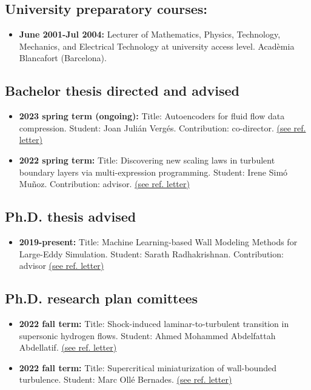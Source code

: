 \documentclass{article}
\begin{document}
\subsection{University preparatory courses:}
\begin{itemize}
\item {\bf June 2001-Jul 2004:}  Lecturer of Mathematics, Physics, Technology, Mechanics, and Electrical Technology at university access level. Acadèmia Blancafort (Barcelona).
\end{itemize}
\subsection{Bachelor thesis directed and advised}

\begin{itemize}
\item {\bf 2023 spring term (ongoing):} Title: Autoencoders for fluid flow data compression. Student: Joan Julián Vergés. Contribution: co-director. \hyperlink{tfg.1}{(see ref. letter)}
\item {\bf 2022 spring term:} Title: Discovering new scaling laws in turbulent boundary layers via multi-expression programming. Student: Irene Simó Muñoz. Contribution: advisor. \hyperlink{tfg.1}{(see ref. letter)}
\end{itemize}

\subsection{Ph.D. thesis advised}

\begin{itemize}
\item {\bf 2019-present:} Title: Machine Learning-based Wall Modeling Methods for Large-Eddy Simulation. Student: Sarath Radhakrishnan. Contribution: advisor \hyperlink{tesis.1}{(see ref. letter)}
\end{itemize}

\subsection{Ph.D. research plan comittees}

\begin{itemize}
\item {\bf 2022 fall term:} Title: Shock-induced laminar-to-turbulent transition in supersonic hydrogen flows. Student: Ahmed Mohammed Abdelfattah Abdellatif. \hyperlink{tribunals.1}{(see ref. letter)}
\item {\bf 2022 fall term:} Title: Supercritical miniaturization of wall-bounded turbulence. Student: Marc Ollé Bernades. \hyperlink{tribunals.1}{(see ref. letter)}
\end{itemize}
\end{document}
